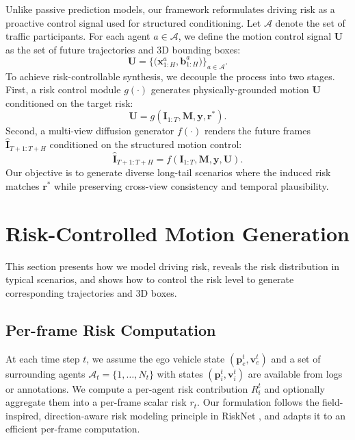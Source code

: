 \documentclass{article}
\begin{document}
Unlike passive prediction models, our framework reformulates driving risk as a proactive control signal used for structured conditioning. Let $\mathcal{A}$ denote the set of traffic participants. For each agent $a \in \mathcal{A}$, we define the motion control signal $\mathbf{U}$ as the set of future trajectories and 3D bounding boxes:
\begin{equation}
\mathbf{U}=\Big\{\big(\mathbf{x}^{a}_{1:H},\mathbf{b}^{a}_{1:H}\big)\Big\}_{a\in\mathcal{A}} .
\label{eq:motion-control-signal}
\end{equation}
To achieve risk-controllable synthesis, we decouple the process into two stages. First, a risk control module $g(\cdot)$ generates physically-grounded motion $\mathbf{U}$ conditioned on the target risk:
\begin{equation}
\mathbf{U}=g\!\left(\mathbf{I}_{1:T},\mathbf{M},\mathbf{y},\mathbf{r}^{*}\right).
\label{eq:risk-conditioned-motion}
\end{equation}
Second, a multi-view diffusion generator $f(\cdot)$ renders the future frames $\hat{\mathbf{I}}_{T+1:T+H}$ conditioned on the structured motion control:
\begin{equation}
\hat{\mathbf{I}}_{T+1:T+H}=f\!\left(\mathbf{I}_{1:T},\mathbf{M},\mathbf{y},\mathbf{U}\right).
\label{eq:multi-view-generation}
\end{equation}
Our objective is to generate diverse long-tail scenarios where the induced risk matches $\mathbf{r}^{*}$ while preserving cross-view consistency and temporal plausibility.

\section{Risk-Controlled Motion Generation}
\label{sec:risk_motion}

This section presents how we model driving risk, reveals the risk distribution in typical scenarios, and shows how to control the risk level to generate corresponding trajectories and 3D boxes.

\subsection{Per-frame Risk Computation}
\label{subsec:risk_comp}

At each time step $t$, we assume the ego vehicle state $(\mathbf{p}_e^t,\mathbf{v}_e^t)$ and a set of surrounding agents
$\mathcal{A}_t=\{1,\dots,N_t\}$ with states $(\mathbf{p}_i^t,\mathbf{v}_i^t)$ are available from logs or annotations.
We compute a per-agent risk contribution $R_i^t$ and optionally aggregate them into a per-frame scalar risk $r_t$.
Our formulation follows the field-inspired, direction-aware risk modeling principle in RiskNet \cite{liu2026risknet},
and adapts it to an efficient per-frame computation.
\end{document}

